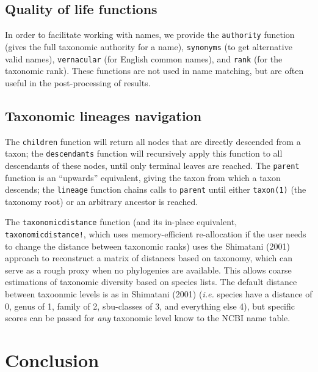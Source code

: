 \documentclass[11pt]{article}
\begin{document}
\hypertarget{quality-of-life-functions}{%
\subsection{Quality of life functions}\label{quality-of-life-functions}}

In order to facilitate working with names, we provide the
\texttt{authority} function (gives the full taxonomic authority for a
name), \texttt{synonyms} (to get alternative valid names),
\texttt{vernacular} (for English common names), and \texttt{rank} (for
the taxonomic rank). These functions are not used in name matching, but
are often useful in the post-processing of results.

\hypertarget{taxonomic-lineages-navigation}{%
\subsection{Taxonomic lineages
navigation}\label{taxonomic-lineages-navigation}}

The \texttt{children} function will return all nodes that are directly
descended from a taxon; the \texttt{descendants} function will
recursively apply this function to all descendants of these nodes, until
only terminal leaves are reached. The \texttt{parent} function is an
``upwards'' equivalent, giving the taxon from which a taxon descends;
the \texttt{lineage} function chains calls to \texttt{parent} until
either \texttt{taxon(1)} (the taxonomy root) or an arbitrary ancestor is
reached.

The \texttt{taxonomicdistance} function (and its in-place equivalent,
\texttt{taxonomicdistance!}, which uses memory-efficient re-allocation
if the user needs to change the distance between taxonomic ranks) uses
the Shimatani (2001) approach to reconstruct a matrix of distances based
on taxonomy, which can serve as a rough proxy when no phylogenies are
available. This allows coarse estimations of taxonomic diversity based
on species lists. The default distance between taxoonmic levels is as in
Shimatani (2001) (\emph{i.e.} species have a distance of 0, genus of 1,
family of 2, sbu-classes of 3, and everything else 4), but specific
scores can be passed for \emph{any} taxonomic level know to the NCBI
name table.

\hypertarget{conclusion}{%
\section{Conclusion}\label{conclusion}}
\end{document}
